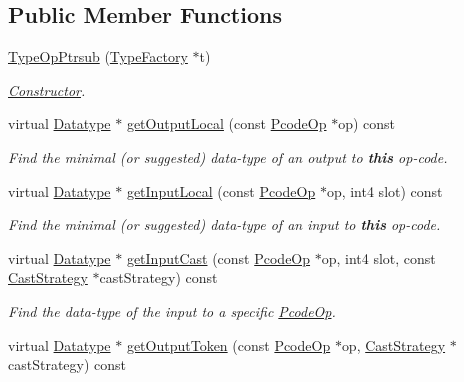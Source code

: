 \subsection*{Public Member Functions}
\begin{DoxyCompactItemize}
\item 
\mbox{\hyperlink{class_type_op_ptrsub_a9e596306d4191f5c31da445bc084a062}{Type\+Op\+Ptrsub}} (\mbox{\hyperlink{class_type_factory}{Type\+Factory}} $\ast$t)
\begin{DoxyCompactList}\small\item\em \mbox{\hyperlink{class_constructor}{Constructor}}. \end{DoxyCompactList}\item 
virtual \mbox{\hyperlink{class_datatype}{Datatype}} $\ast$ \mbox{\hyperlink{class_type_op_ptrsub_ada6371e868ebf8d0f5aae1ba70a60e36}{get\+Output\+Local}} (const \mbox{\hyperlink{class_pcode_op}{Pcode\+Op}} $\ast$op) const
\begin{DoxyCompactList}\small\item\em Find the minimal (or suggested) data-\/type of an output to {\bfseries{this}} op-\/code. \end{DoxyCompactList}\item 
virtual \mbox{\hyperlink{class_datatype}{Datatype}} $\ast$ \mbox{\hyperlink{class_type_op_ptrsub_aeb893948a1260af75942c71c4a2e19cd}{get\+Input\+Local}} (const \mbox{\hyperlink{class_pcode_op}{Pcode\+Op}} $\ast$op, int4 slot) const
\begin{DoxyCompactList}\small\item\em Find the minimal (or suggested) data-\/type of an input to {\bfseries{this}} op-\/code. \end{DoxyCompactList}\item 
virtual \mbox{\hyperlink{class_datatype}{Datatype}} $\ast$ \mbox{\hyperlink{class_type_op_ptrsub_a3c651a295323c8fbb431f26aa07b92f9}{get\+Input\+Cast}} (const \mbox{\hyperlink{class_pcode_op}{Pcode\+Op}} $\ast$op, int4 slot, const \mbox{\hyperlink{class_cast_strategy}{Cast\+Strategy}} $\ast$cast\+Strategy) const
\begin{DoxyCompactList}\small\item\em Find the data-\/type of the input to a specific \mbox{\hyperlink{class_pcode_op}{Pcode\+Op}}. \end{DoxyCompactList}\item 
virtual \mbox{\hyperlink{class_datatype}{Datatype}} $\ast$ \mbox{\hyperlink{class_type_op_ptrsub_a1830a4ee48307559c378c4147aa19979}{get\+Output\+Token}} (const \mbox{\hyperlink{class_pcode_op}{Pcode\+Op}} $\ast$op, \mbox{\hyperlink{class_cast_strategy}{Cast\+Strategy}} $\ast$cast\+Strategy) const

\end{DoxyCompactItemize}
